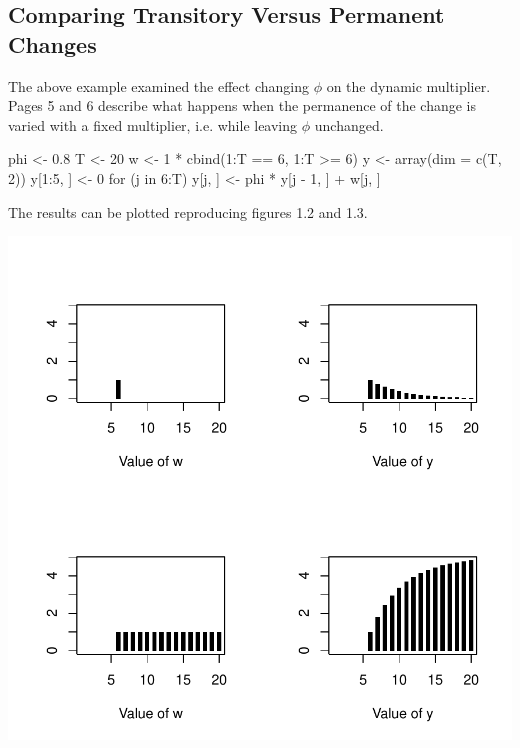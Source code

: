 \documentclass[a4paper]{article}
\begin{document}
\subsection{Comparing Transitory Versus Permanent Changes}
The above example examined the effect changing $\phi$ on the dynamic multiplier.  Pages 5 and 6 
describe what happens when the permanence of the change is varied with a fixed multiplier, i.e.
while leaving $\phi$ unchanged.
\begin{Schunk}
\begin{Sinput}
 phi <- 0.8
 T <- 20
 w <- 1 * cbind(1:T == 6, 1:T >= 6)
 y <- array(dim = c(T, 2))
 y[1:5, ] <- 0
 for (j in 6:T) y[j, ] <- phi * y[j - 1, ] + w[j, ]
\end{Sinput}
\end{Schunk}
The results can be plotted reproducing figures 1.2 and 1.3.
\begin{center}
\includegraphics{Companion-010}
\end{center}
\end{document}
